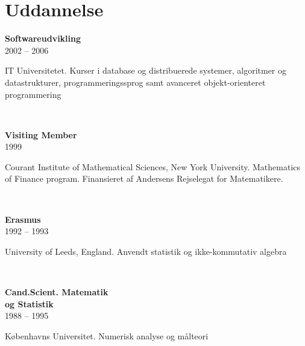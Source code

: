 \documentclass[10pt, a4paper]{article}
\begin{document}
\section{Uddannelse}
\begin{Row}%
  \begin{Cell}{1}
    \textbf{Softwareudvikling} \\[1ex]
    2002 -- 2006 %
  \end{Cell}
  \begin{Cell}{3}
    IT Universitetet. Kurser i database og distribuerede systemer, algoritmer og datastrukturer, programmeringssprog samt avanceret objekt-orienteret programmering
  \end{Cell}
\end{Row}
\\[0.5cm]
\begin{Row}%
  \begin{Cell}{1}
    \textbf{Visiting Member} \\[1ex]
    1999
  \end{Cell}
  \begin{Cell}{3}
    Courant Institute of Mathematical Sciences, New York University. Mathematics of Finance program. Finansieret af Andersens Rejselegat for Matematikere.
  \end{Cell}
\end{Row}
\\[0.5cm]
\begin{Row}%
  \begin{Cell}{1}
    \textbf{Erasmus} \\[1ex]
    1992 -- 1993 %
  \end{Cell}
  \begin{Cell}{3}
    University of Leeds, England. Anvendt statistik og ikke-kommutativ algebra
  \end{Cell}
\end{Row}
\\[0.5cm]
\begin{Row}%
  \begin{Cell}{1}
    \textbf{Cand.Scient. Matematik \\ og Statistik} \\[1ex]
    1988 -- 1995 %
  \end{Cell}
  \begin{Cell}{3}
    Københavns Universitet. Numerisk analyse og målteori
  \end{Cell}
\end{Row}

\end{document}
